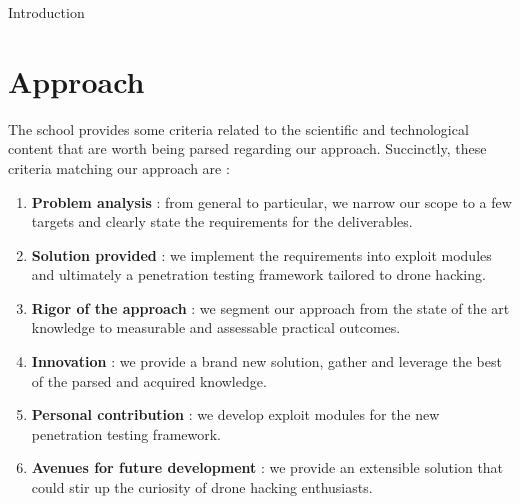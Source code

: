 \begin{chaptercover}{Introduction}
\section{Approach}
The school provides some criteria related to the scientific and technological content that are worth being parsed regarding our approach. Succinctly, these criteria matching our approach are :
{\hyphenation{}
\begin{enumerate}[itemsep=0.1cm,topsep=0.1cm]
  \item {\color{FirstBlue}\bfseries Problem analysis} : from general to particular, we narrow our scope to a few targets and clearly state the requirements for the deliverables.
  \item {\color{FirstBlue}\bfseries Solution provided} : we implement the requirements into exploit modules and ultimately a penetration testing framework tailored to drone hacking.
  \item {\color{FirstBlue}\bfseries Rigor of the approach} : we segment our approach from the state of the art knowledge to measurable and assessable practical outcomes.
  \item {\color{FirstBlue}\bfseries Innovation} : we provide a brand new solution, gather and leverage the best of the parsed and acquired knowledge.
  \item {\color{FirstBlue}\bfseries Personal contribution} : we develop exploit modules for the new penetration testing framework.
  \item {\color{FirstBlue}\bfseries Avenues for future development} : we provide an extensible solution that could stir up the curiosity of drone hacking enthusiasts.
\end{enumerate}}


\end{chaptercover}
